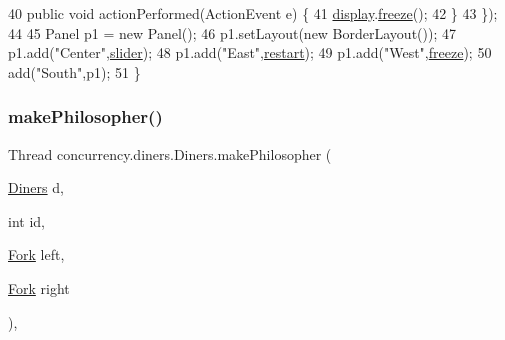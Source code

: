 \begin{DoxyCode}
40           \textcolor{keyword}{public} \textcolor{keywordtype}{void} actionPerformed(ActionEvent e) \{
41             \mbox{\hyperlink{classconcurrency_1_1diners_1_1_diners_a89ca881884065b1e357a0556bb1be1fe}{display}}.\mbox{\hyperlink{classconcurrency_1_1diners_1_1_phil_canvas_a25f9595a38651070830f45ef9a4c2b51}{freeze}}();
42           \}
43         \});
44 
45         Panel p1 = \textcolor{keyword}{new} Panel();
46         p1.setLayout(\textcolor{keyword}{new} BorderLayout());
47         p1.add(\textcolor{stringliteral}{"Center"},\mbox{\hyperlink{classconcurrency_1_1diners_1_1_diners_a39973398065942d8583b0c74d4c2365f}{slider}});
48         p1.add(\textcolor{stringliteral}{"East"},\mbox{\hyperlink{classconcurrency_1_1diners_1_1_diners_abefc470d4d20e4ac1877eca30012b009}{restart}});
49         p1.add(\textcolor{stringliteral}{"West"},\mbox{\hyperlink{classconcurrency_1_1diners_1_1_diners_a3d8a584bc67f1e9bf15ff9236cb078f9}{freeze}});
50         add(\textcolor{stringliteral}{"South"},p1);
51     \}
\end{DoxyCode}
\mbox{\label{classconcurrency_1_1diners_1_1_diners_a2576319d2ab7d71417cccc214fab518d}} 
\subsubsection{\texorpdfstring{make\+Philosopher()}{makePhilosopher()}}
{\footnotesize\ttfamily Thread concurrency.\+diners.\+Diners.\+make\+Philosopher (\begin{DoxyParamCaption}\item[{\mbox{\hyperlink{classconcurrency_1_1diners_1_1_diners}{Diners}}}]{d,  }\item[{int}]{id,  }\item[{\mbox{\hyperlink{classconcurrency_1_1diners_1_1_fork}{Fork}}}]{left,  }\item[{\mbox{\hyperlink{classconcurrency_1_1diners_1_1_fork}{Fork}}}]{right }\end{DoxyParamCaption})\hspace{0.3cm}{\ttfamily [inline]}, {\ttfamily [package]}}


